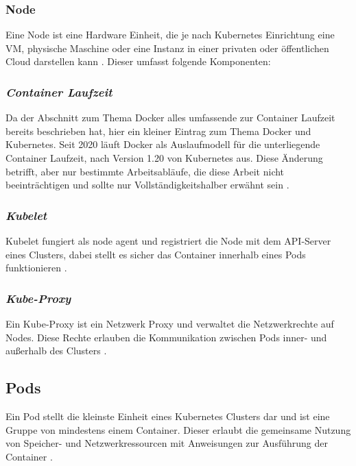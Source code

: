 \subsubsection{Node}
Eine Node ist eine Hardware Einheit, die je nach Kubernetes Einrichtung eine
VM, physische Maschine oder eine Instanz in einer privaten oder öffentlichen Cloud darstellen kann \cite{kubernetesnodes}.
Dieser umfasst folgende Komponenten:

\subsubsection{\textit{Container Laufzeit}}
Da der Abschnitt zum Thema Docker alles umfassende zur Container Laufzeit bereits beschrieben hat,
hier ein kleiner Eintrag zum Thema Docker und Kubernetes.
Seit 2020 läuft Docker als Auslaufmodell für die unterliegende Container Laufzeit, nach Version 1.20 von Kubernetes aus.
Diese Änderung betrifft, aber nur bestimmte Arbeitsabläufe, die diese Arbeit nicht beeinträchtigen und sollte
nur Vollständigkeitshalber erwähnt sein \cite{kubernetesdocker}.

\subsubsection{\textit{Kubelet}}
Kubelet fungiert als \glqq node agent\grqq{} und registriert die Node mit dem
API-Server eines Clusters, dabei stellt es sicher das Container innerhalb eines Pods
funktionieren \cite{kubernetesnodes}.

\subsubsection{\textit{Kube-Proxy}}
Ein Kube-Proxy ist ein Netzwerk Proxy und verwaltet die Netzwerkrechte auf Nodes.
Diese Rechte erlauben die Kommunikation zwischen Pods inner- und außerhalb des Clusters \cite{kubernetesnodes}.

\subsection{Pods}
Ein Pod stellt die kleinste Einheit eines Kubernetes Clusters dar und ist eine Gruppe von mindestens einem Container.
Dieser erlaubt die gemeinsame Nutzung von Speicher- und Netzwerkressourcen mit Anweisungen zur Ausführung der Container \cite{kubernetespods}.

